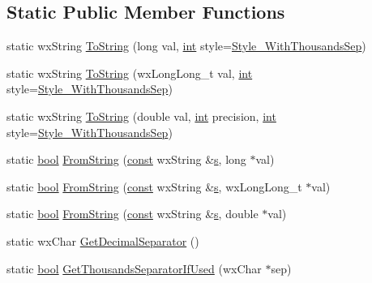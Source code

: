 \subsection*{Static Public Member Functions}
\begin{DoxyCompactItemize}
\item 
static wx\+String \hyperlink{class_number_formatter_ac348f3bf60fda5353e97d1e0d31fa994}{To\+String} (long val, \hyperlink{xmltok_8h_a5a0d4a5641ce434f1d23533f2b2e6653}{int} style=\hyperlink{class_number_formatter_abe9347e515a52a6b16988ba9919e1d19af4480c7e796250247fb32e315b830369}{Style\+\_\+\+With\+Thousands\+Sep})
\item 
static wx\+String \hyperlink{class_number_formatter_ab316b7e649066e8b7e2d2e71ed8b5a99}{To\+String} (wx\+Long\+Long\+\_\+t val, \hyperlink{xmltok_8h_a5a0d4a5641ce434f1d23533f2b2e6653}{int} style=\hyperlink{class_number_formatter_abe9347e515a52a6b16988ba9919e1d19af4480c7e796250247fb32e315b830369}{Style\+\_\+\+With\+Thousands\+Sep})
\item 
static wx\+String \hyperlink{class_number_formatter_a65a1e78627040d268d16f5410d8c75e8}{To\+String} (double val, \hyperlink{xmltok_8h_a5a0d4a5641ce434f1d23533f2b2e6653}{int} precision, \hyperlink{xmltok_8h_a5a0d4a5641ce434f1d23533f2b2e6653}{int} style=\hyperlink{class_number_formatter_abe9347e515a52a6b16988ba9919e1d19af4480c7e796250247fb32e315b830369}{Style\+\_\+\+With\+Thousands\+Sep})
\item 
static \hyperlink{mac_2config_2i386_2lib-src_2libsoxr_2soxr-config_8h_abb452686968e48b67397da5f97445f5b}{bool} \hyperlink{class_number_formatter_a00b13a190cc812d16ef47bb8caf08e66}{From\+String} (\hyperlink{getopt1_8c_a2c212835823e3c54a8ab6d95c652660e}{const} wx\+String \&\hyperlink{lib_2expat_8h_a755339d27872b13735c2cab829e47157}{s}, long $\ast$val)
\item 
static \hyperlink{mac_2config_2i386_2lib-src_2libsoxr_2soxr-config_8h_abb452686968e48b67397da5f97445f5b}{bool} \hyperlink{class_number_formatter_a00f0d3585f717bd24faaefd870d9d285}{From\+String} (\hyperlink{getopt1_8c_a2c212835823e3c54a8ab6d95c652660e}{const} wx\+String \&\hyperlink{lib_2expat_8h_a755339d27872b13735c2cab829e47157}{s}, wx\+Long\+Long\+\_\+t $\ast$val)
\item 
static \hyperlink{mac_2config_2i386_2lib-src_2libsoxr_2soxr-config_8h_abb452686968e48b67397da5f97445f5b}{bool} \hyperlink{class_number_formatter_a78c66fed68d71811f92ae14d08ebc54d}{From\+String} (\hyperlink{getopt1_8c_a2c212835823e3c54a8ab6d95c652660e}{const} wx\+String \&\hyperlink{lib_2expat_8h_a755339d27872b13735c2cab829e47157}{s}, double $\ast$val)
\item 
static wx\+Char \hyperlink{class_number_formatter_a1b410d6a54777a4ae9fe04576de755df}{Get\+Decimal\+Separator} ()
\item 
static \hyperlink{mac_2config_2i386_2lib-src_2libsoxr_2soxr-config_8h_abb452686968e48b67397da5f97445f5b}{bool} \hyperlink{class_number_formatter_a53bda31db7ac3286550f6f26c5c9ca84}{Get\+Thousands\+Separator\+If\+Used} (wx\+Char $\ast$sep)
\end{DoxyCompactItemize}
